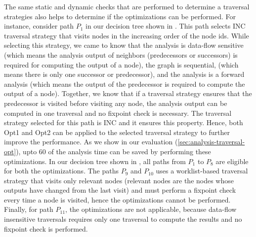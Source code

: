 The same static and dynamic checks that are performed to determine a traversal strategies
also helps to determine if the optimizations can be performed. For instance, consider path
$P_1$ in our decision tree shown in . This path selects INC traversal strategy that
visits nodes in the increasing order of the node ids. While selecting this strategy, we came to know that the analysis is data-flow sensitive (which means the analysis output of neighbors
(predecessors or successors) is required for computing the output of a node), the graph is
sequential, (which means there is only one successor or predecessor), and the analysis is a
forward analysis (which means the output of the predecessor is required to compute the
output of a node). Together, we know that if a traversal strategy ensures that the predecessor
is visited before visiting any node, the analysis output can be computed in one traversal and
no fixpoint check is necessary. The traversal strategy selected for this path is INC and it
ensures this property. Hence, both Opt1 and Opt2 can be applied to the selected traversal
strategy to further improve the performance. As we show in our evaluation (\ref{sec:analysis-traversal-opt}), upto 60%
of the analysis time can be saved by performing these optimizations.
In our decision tree shown in , all paths from $P_1$ to $P_8$ are eligible for both the
optimizations. The paths $P_9$ and $P_10$ uses a worklist-based traversal strategy that visits only
relevant nodes (relevant nodes are the nodes whose outputs have changed from the last visit)
and must perform a fixpoint check every time a node is visited, hence the optimizations
cannot be performed. Finally, for path $P_11$, the optimizations are not applicable, because
data-flow insensitive traversals requires only one traversal to compute the results and no
fixpoint check is performed.
% 
% 
